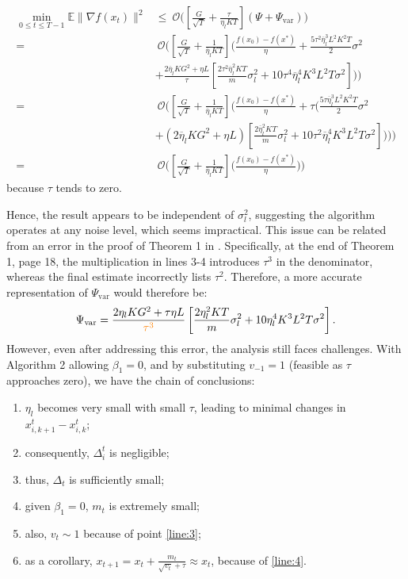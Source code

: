 \documentclass[sn-mathphys,Numbered]{sn-jnl}%
\newcommand*{\E}{{\mathbb E}}
\renewcommand{\|}{\parallel}
\renewcommand {\*} {\ast}
\begin{document}
\begin{align*}
     \min_{0 \leq t \leq T-1} \E\|\nabla f(x_t)\|^2 &\leq \ \mathcal{O}\bigg(\left[\frac{G}{\sqrt{T}} + \frac{\tau}{\eta_lKT}\right] \left( \Psi + {\Psi}_{\mathrm{var}} \right)\bigg) \\ =&\ \mathcal{O}\bigg(\left[\frac{G}{\sqrt{T}} + \frac{1}{\overline{\eta}_lKT}\right] \bigg(\frac{f(x_0) - f(x^*)}{\eta} +  \frac{5\tau^2\overline{\eta}_l^3L^2K^2T}{2} \sigma^2 \\
     &+ \frac{2\overline{\eta}_lKG^2 + \eta L}{\tau} \left[ \frac{2\tau^2\overline{\eta}_l^2KT}{m} \sigma_{l}^2 + 10\tau^4\overline{\eta}_l^4K^3L^2T \sigma^2\right] \bigg)\bigg) \\
     =&\ \mathcal{O}\bigg(\left[\frac{G}{\sqrt{T}} + \frac{1}{\overline{\eta}_lKT}\right] \bigg(\frac{f(x_0) - f(x^*)}{\eta} + \tau\bigg( \frac{5\tau\overline{\eta}_l^3L^2K^2T}{2} \sigma^2 \\
     &+ (2\overline{\eta}_lKG^2 + \eta L) \left[ \frac{2\overline{\eta}_l^2KT}{m} \sigma_{l}^2 + 10\tau^2\overline{\eta}_l^4K^3L^2T \sigma^2\right] \bigg)\bigg)\bigg) \\
     =&\ \mathcal{O}\bigg(\left[\frac{G}{\sqrt{T}} + \frac{1}{\overline{\eta}_lKT}\right] \bigg(\frac{f(x_0) - f(x^*)}{\eta}\bigg)\bigg)
\end{align*}
because  $\tau$ tends to zero.


Hence, the result appears to be independent of $\sigma_l^2$, suggesting the algorithm operates at any noise level, which seems impractical.
This issue can be related from an error in the proof of Theorem 1 in \cite{reddi2020adaptive}. 
Specifically, at the end of Theorem 1, page 18, the multiplication in lines 3-4 introduces $\tau^3$ in the denominator, whereas the final estimate incorrectly lists $\tau^2$. Therefore, a more accurate representation of ${\Psi}_{\mathrm{var}}$ would therefore be:
\[
 {\Psi}_{\mathrm{var}} =  \frac{2\eta_lKG^2 + \tau\eta L}{\textcolor{orange}{\tau^3}} \left[ \frac{2\eta_l^2KT}{m} \sigma_{l}^2 + 10\eta_l^4K^3L^2T \sigma^2\right].
\]\noindent
However, even after addressing this error, the analysis still faces challenges. With Algorithm 2 allowing $\beta_1=0$, and by substituting $v_{-1} = 1$ (feasible as $\tau$ approaches zero),  we have the chain of conclusions:
\begin{enumerate} 
    \item $\eta_l$ becomes very small with small $\tau$, leading to minimal changes in $x_{i,k+1}^t - x_{i, k}^t$;

    \item consequently, $\Delta_i^t$ is negligible;
    \item thus, $\Delta_t$ is sufficiently small;
    \label{line:3}
     
    \item given $\beta_1 = 0$, $m_t$ is extremely small;
\label{line:4}
    
    \item also, $v_t \sim 1$ because of point \ref{line:3};
    \item as a corollary, $x_{t+1} = x_t + \frac{m_t}{\sqrt{v_t} + \tau} \approx x_t$, because of \ref{line:4}.
    
\end{enumerate}   
\end{document}

